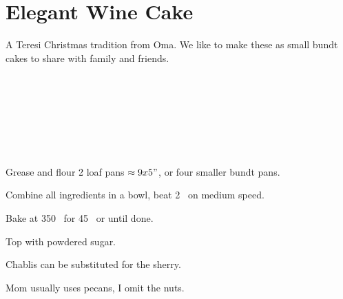 \section{Elegant Wine Cake}


\begin{recipestats}[
	servings=2 loafs,
	preptime=10 \minute,
	bakingtime=45 \minute,
	source=Lucille Steinmiller (Oma),
	]
\end{recipestats}


\begin{recipeabstract}
	A Teresi Christmas tradition from Oma.
	We like to make these as small bundt cakes to share with family and friends.
\end{recipeabstract}


\begin{ingredientcolumns}[1]
	\begin{ingredientblock}
		\\
		\\
		\\
		\\
		\\
		\\
	\end{ingredientblock}
\end{ingredientcolumns}


\begin{preparation}
\item Grease and flour 2 loaf pans $\approx 9x5"$, or four smaller bundt pans.

\item Combine all ingredients in a bowl, beat 2 \minute~on medium speed.

\item Bake at 350 \Fahrenheit~for 45 \minute~or until done.

\item Top with powdered sugar.
\end{preparation}

\begin{variation}
\item Chablis can be substituted for the sherry.

\item Mom usually uses pecans, I  omit the nuts.
\end{variation}


\recipeend
